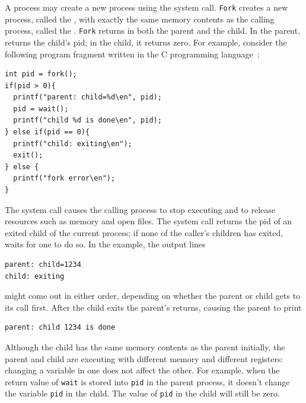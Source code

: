 A process may create a new process using the
system call.
\lstinline{Fork}
creates a new process, called the 
, 
with exactly the same memory contents
as the calling process, called the 
.
\lstinline{Fork}
returns in both the parent and the child.
In the parent,
returns the child's pid;
in the child, it returns zero.
For example, consider the following program fragment written in the C
programming language~\cite{kernighan}:
\begin{lstlisting}[]
int pid = fork();
if(pid > 0){
  printf("parent: child=%d\en", pid);
  pid = wait();
  printf("child %d is done\en", pid);
} else if(pid == 0){
  printf("child: exiting\en");
  exit();
} else {
  printf("fork error\en");
}
\end{lstlisting}
The
system call causes the calling process to stop executing and
to release resources such as memory and open files.
The
system call returns the pid of an exited child of the
current process; if none of the caller's children
has exited,
waits for one to do so.
In the example, the output lines
\begin{lstlisting}[]
parent: child=1234
child: exiting
\end{lstlisting}
might come out in either order, depending on whether the
parent or child gets to its
call first.
After the child exits the parent's
returns, causing the parent to print
\begin{lstlisting}[]
parent: child 1234 is done
\end{lstlisting}
Although the child has the same memory contents as the parent initially, the
parent and child are executing with different memory and different registers:
changing a variable in one does not affect the other. For example, when the
return value of
\lstinline{wait}
is stored into
\lstinline{pid} 
in the parent process,
it doesn't change the variable 
\lstinline{pid}
in the child.  The value of
\lstinline{pid}
in the child will still be zero.

